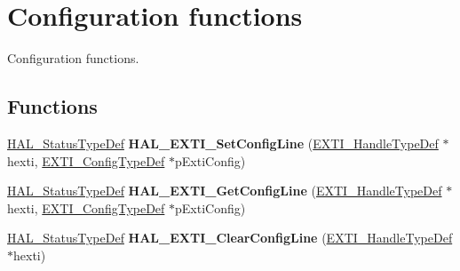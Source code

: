 \hypertarget{group___e_x_t_i___exported___functions___group1}{}\section{Configuration functions}
\label{group___e_x_t_i___exported___functions___group1}


Configuration functions.  


\subsection*{Functions}
\begin{DoxyCompactItemize}
\item 
\mbox{\label{group___e_x_t_i___exported___functions___group1_ga21c31dc6d13f1e32b4352e00ab6ad2b3}} 
\mbox{\hyperlink{stm32f7xx__hal__def_8h_a63c0679d1cb8b8c684fbb0632743478f}{H\+A\+L\+\_\+\+Status\+Type\+Def}} {\bfseries H\+A\+L\+\_\+\+E\+X\+T\+I\+\_\+\+Set\+Config\+Line} (\mbox{\hyperlink{struct_e_x_t_i___handle_type_def}{E\+X\+T\+I\+\_\+\+Handle\+Type\+Def}} $\ast$hexti, \mbox{\hyperlink{struct_e_x_t_i___config_type_def}{E\+X\+T\+I\+\_\+\+Config\+Type\+Def}} $\ast$p\+Exti\+Config)
\item 
\mbox{\label{group___e_x_t_i___exported___functions___group1_gabc6617165a2712df438f38509c8205dd}} 
\mbox{\hyperlink{stm32f7xx__hal__def_8h_a63c0679d1cb8b8c684fbb0632743478f}{H\+A\+L\+\_\+\+Status\+Type\+Def}} {\bfseries H\+A\+L\+\_\+\+E\+X\+T\+I\+\_\+\+Get\+Config\+Line} (\mbox{\hyperlink{struct_e_x_t_i___handle_type_def}{E\+X\+T\+I\+\_\+\+Handle\+Type\+Def}} $\ast$hexti, \mbox{\hyperlink{struct_e_x_t_i___config_type_def}{E\+X\+T\+I\+\_\+\+Config\+Type\+Def}} $\ast$p\+Exti\+Config)
\item 
\mbox{\label{group___e_x_t_i___exported___functions___group1_gae8ed1defdcf965a62618af09c45c7866}} 
\mbox{\hyperlink{stm32f7xx__hal__def_8h_a63c0679d1cb8b8c684fbb0632743478f}{H\+A\+L\+\_\+\+Status\+Type\+Def}} {\bfseries H\+A\+L\+\_\+\+E\+X\+T\+I\+\_\+\+Clear\+Config\+Line} (\mbox{\hyperlink{struct_e_x_t_i___handle_type_def}{E\+X\+T\+I\+\_\+\+Handle\+Type\+Def}} $\ast$hexti)
\item 
\mbox{\label{group___e_x_t_i___exported___functions___group1_gacb6ee7e9f2429c3c3a1c99d4fe2d26d7}} 

\end{DoxyCompactItemize}
